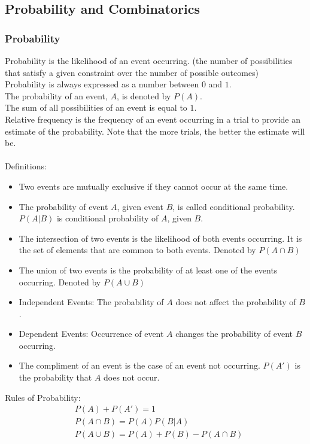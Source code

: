 \documentclass[11pt, fleqn]{article}
\begin{document}
\subsection{Probability and Combinatorics}

\subsubsection{Probability}
Probability is the likelihood of an event occurring. (the number of possibilities that satisfy a given constraint over the number of possible outcomes)\\
Probability is always expressed as a number between $0$ and $1$.\\
The probability of an event, $A$, is denoted by $P(A)$.\\
The sum of all possibilities of an event is equal to $1$.\\
Relative frequency is the frequency of an event occurring in a trial to provide an estimate of the probability. Note that the more trials, the better the estimate will be.\\
\\
Definitions:
\begin{itemize}
    \item Two events are mutually exclusive if they cannot occur at the same time.
    \item The probability of event $A$, given event $B$, is called conditional probability. $P(A|B)$ is conditional probability of $A$, given $B$.
    \item The intersection of two events is the likelihood of both events occurring. It is the set of elements that are common to both events. Denoted by $P(A\cap B)$
    \item The union of two events is the probability of at least one of the events occurring. Denoted by $P(A\cup B)$
    \item Independent Events: The probability of $A$ does not affect the probability of $B$.
    \item Dependent Events: Occurrence of event $A$ changes the probability of event $B$ occurring.
    \item The compliment of an event is the case of an event not occurring. $P(A')$ is the probability that $A$ does not occur.
\end{itemize}
Rules of Probability:
\begin{align*}
    &P(A)+P(A')=1\\
    &P(A\cap B)=P(A)P(B|A)\\
    &P(A\cup B)=P(A)+P(B)-P(A\cap B)
\end{align*}
\end{document}
